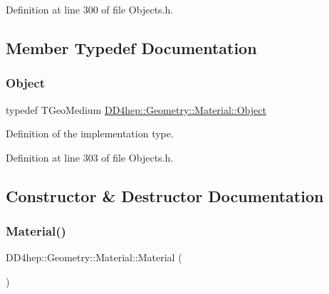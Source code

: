 Definition at line 300 of file Objects.\+h.



\subsection{Member Typedef Documentation}
\hypertarget{class_d_d4hep_1_1_geometry_1_1_material_afdf167b558006f1bf7348fa5e812f4d8}{}\label{class_d_d4hep_1_1_geometry_1_1_material_afdf167b558006f1bf7348fa5e812f4d8} 
\subsubsection{\texorpdfstring{Object}{Object}}
{\footnotesize\ttfamily typedef T\+Geo\+Medium \hyperlink{class_d_d4hep_1_1_geometry_1_1_material_afdf167b558006f1bf7348fa5e812f4d8}{D\+D4hep\+::\+Geometry\+::\+Material\+::\+Object}}



Definition of the implementation type. 



Definition at line 303 of file Objects.\+h.



\subsection{Constructor \& Destructor Documentation}
\hypertarget{class_d_d4hep_1_1_geometry_1_1_material_a0af6f273d664a63108c7100913355d98}{}\label{class_d_d4hep_1_1_geometry_1_1_material_a0af6f273d664a63108c7100913355d98} 
\subsubsection{\texorpdfstring{Material()}{Material()}\hspace{0.1cm}{\footnotesize\ttfamily [1/3]}}
{\footnotesize\ttfamily D\+D4hep\+::\+Geometry\+::\+Material\+::\+Material (\begin{DoxyParamCaption}{ }\end{DoxyParamCaption})\hspace{0.3cm}{\ttfamily [inline]}}



